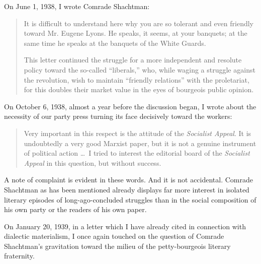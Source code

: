 
\noindent
On June 1, 1938, I wrote Comrade Shachtman:

\begin{quote}
  It is difficult to understand here why you are so tolerant and even friendly toward Mr. Eugene Lyons. He speaks, it seems, at your banquets; at the same time he speaks at the banquets of the White Guards.

  This letter continued the struggle for a more independent and resolute policy toward the so-called “liberals,” who, while waging a struggle against the revolution, wish to maintain “friendly relations” with the proletariat, for this doubles their market value in the eyes of bourgeois public opinion.
\end{quote}


\noindent
On October 6, 1938, almost a year before the discussion began, I wrote about the necessity of our party press turning its face decisively toward the workers:

\begin{quote}
  Very important in this respect is the attitude of the \emph{Socialist Appeal}. It is undoubtedly a very good Marxist paper, but it is not a genuine instrument of political action \dots\ I tried to interest the editorial board of the \emph{Socialist Appeal} in this question, but without success.
\end{quote}

A note of complaint is evident in these words. And it is not accidental. Comrade Shachtman as has been mentioned already displays far more interest in isolated literary episodes of long-ago-concluded struggles than in the social composition of his own party or the readers of his own paper.


\noindent
On January 20, 1939, in a letter which I have already cited in connection with dialectic materialism, I once again touched on the question of Comrade Shachtman’s gravitation toward the milieu of the petty-bourgeois literary fraternity.

